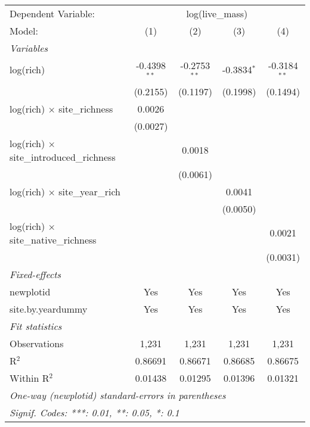 \begin{tabular}{lcccc}
\tabularnewline\midrule\midrule
Dependent Variable:&\multicolumn{4}{c}{log(live\_mass)}\\
Model:&(1) & (2) & (3) & (4)\\
\midrule \emph{Variables}&   &   &   &  \\
log(rich)&-0.4398$^{**}$ & -0.2753$^{**}$ & -0.3834$^{*}$ & -0.3184$^{**}$\\
  &(0.2155) & (0.1197) & (0.1998) & (0.1494)\\
log(rich) $\times $ site\_richness&0.0026 &    &    &   \\
  &(0.0027) &    &    &   \\
log(rich) $\times $ site\_introduced\_richness&   & 0.0018 &    &   \\
  &   & (0.0061) &    &   \\
log(rich) $\times $ site\_year\_rich&   &    & 0.0041 &   \\
  &   &    & (0.0050) &   \\
log(rich) $\times $ site\_native\_richness&   &    &    & 0.0021\\
  &   &    &    & (0.0031)\\
\midrule \emph{Fixed-effects}&   &   &   &  \\
newplotid & Yes & Yes & Yes & Yes\\
site.by.yeardummy & Yes & Yes & Yes & Yes\\
\midrule \emph{Fit statistics}&  & & & \\
Observations & 1,231&1,231&1,231&1,231\\
R$^2$ & 0.86691&0.86671&0.86685&0.86675\\
Within R$^2$ & 0.01438&0.01295&0.01396&0.01321\\
\midrule\midrule\multicolumn{5}{l}{\emph{One-way (newplotid) standard-errors in parentheses}}\\
\multicolumn{5}{l}{\emph{Signif. Codes: ***: 0.01, **: 0.05, *: 0.1}}\\
\end{tabular}


